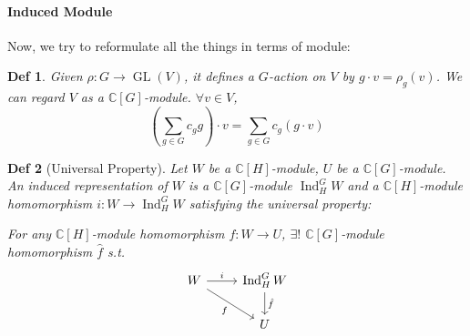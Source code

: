 \documentclass[a4paper]{article}
\newcommand*{\Cb}{\mathbb{C}}
\DeclareMathOperator{\Ind}{Ind}
\newcommand*\GL[1]{\operatorname{GL}\mathopen{}\left({#1}\right)\mathclose{}}
\theoremstyle{mystyle}
\newtheorem{definition}{Def}
\begin{document}
\paragraph{Induced Module}
Now, we try to reformulate all the things in terms of module:

\begin{definition}
  Given $\rho: G\to \GL{V}$, it defines a $G$-action on $V$ by
  $g\cdot v = \rho_g(v)$. We can regard $V$ as a $\Cb[G]$-module.
  $\forall v \in V$,
  \[
    \left(\sum_{g\in G} c_g g\right) \cdot v
    =\sum_{g\in G} c_g (g\cdot v)
  \]
\end{definition}

\begin{definition}[Universal Property]
  Let $W$ be a $\Cb[H]$-module, $U$ be a $\Cb[G]$-module.
  An induced representation of $W$ is a $\Cb[G]$-module $\Ind^G_H W$ and a
  $\Cb[H]$-module homomorphism $i: W \to \Ind^G_H W$ satisfying the
  universal property:
  
  For any $\Cb[H]$-module homomorphism $f: W\to U$, $\exists!$ $\Cb[G]$-module
  homomorphism $\hat{f}$ s.t.
  \[
    \begin{tikzcd}
      W \arrow[r, "i"] \arrow[dr, "f"'] & \Ind^G_H W \arrow[d, "\hat{f}"] \\
                                        & U
    \end{tikzcd}
  \]
\end{definition}
\end{document}
